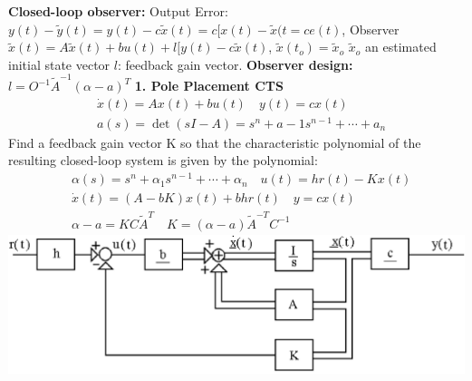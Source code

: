 \begin{multicols*}{3}
\textbf{Closed-loop observer:}
Output Error: $y(t)-\tilde{y}(t)=y(t)-c\tilde{x}(t)=c[x(t)-\tilde{x}(t=ce(t)$, Observer $\tilde{x}(t)=A \tilde{x}(t)+bu(t)+l[y(t)-c\tilde{x}(t)$, $\tilde{x}(t_o)=\tilde{x}_o$ $\tilde{x}_o$ an estimated initial state vector $l$: feedback gain vector.
\textbf{Observer design:}
$l=O^{-1}\tilde{A}^{-1}(\alpha-a)^T$ \hfill \break 
\textbf{1. Pole Placement CTS}
\setlength{\abovedisplayskip}{0pt}
\setlength{\belowdisplayskip}{0pt}
\setlength{\abovedisplayshortskip}{0pt}
\setlength{\belowdisplayshortskip}{0pt}
\begin{align*}
& \dot{x}(t)=Ax(t)+bu(t) \quad y(t)=cx(t) \\
& a(s) = \det(sI-A)=s^n+a-1s^{n-1}+ \cdots + a_n
\end{align*}
 \noindent Find a feedback gain vector K so that the characteristic polynomial of the resulting closed-loop system is given by the polynomial:
\begin{align*}
& \alpha(s) =s^n+\alpha_1s^{n-1}+ \cdots + \alpha_n \quad u(t) =hr(t)- Kx(t) \\
& \dot{x}(t) = (A-bK)x(t)+b h r(t) \quad y=cx(t) \\
& \alpha - a = K C \tilde{A}^T \quad K =(\alpha -a)\tilde{A}^{-T} C^{-1}
\end{align*}
 \vspace*{-0.2cm}
\includegraphics[width=\linewidth]{poleplacementPic.png}

\end{multicols*}
